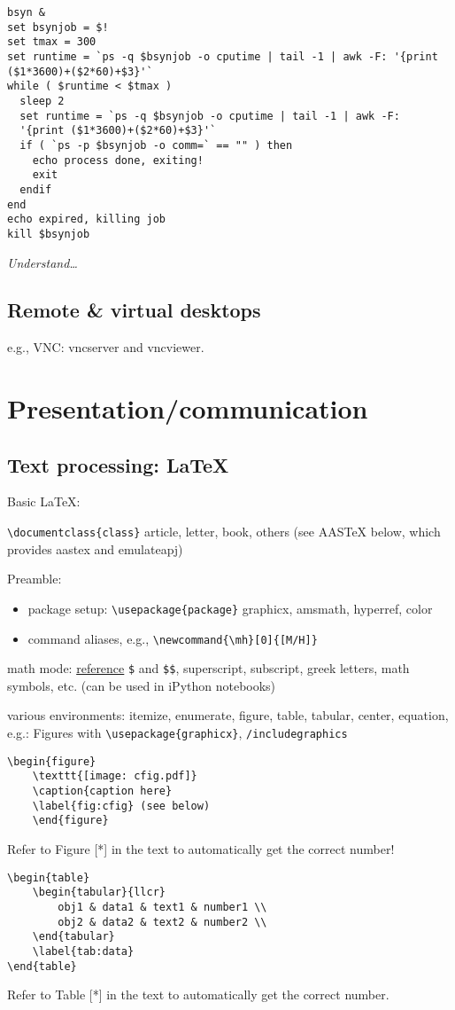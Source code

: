 \documentclass{article}
\newcommand{\test}[1]{%
    \begin{center}
        \colorbox{hl}{\parbox{0.9\textwidth}{\emph{\centering #1}}}
    \end{center}}
\begin{document}
\begin{verbatim}
bsyn &
set bsynjob = $!
set tmax = 300
set runtime = `ps -q $bsynjob -o cputime | tail -1 | awk -F: '{print ($1*3600)+($2*60)+$3}'`
while ( $runtime < $tmax )
  sleep 2
  set runtime = `ps -q $bsynjob -o cputime | tail -1 | awk -F:
  '{print ($1*3600)+($2*60)+$3}'`
  if ( `ps -p $bsynjob -o comm=` == "" ) then
    echo process done, exiting!
    exit
  endif
end
echo expired, killing job
kill $bsynjob
\end{verbatim}

\test{Understand\ldots}

\subsection{Remote \& virtual desktops}
e.g., VNC: vncserver and vncviewer.

\section{Presentation/communication}
\subsection{Text processing: LaTeX}

Basic LaTeX:

\verb|\documentclass{class}| article, letter, book, others (see AASTeX
below, which provides aastex and emulateapj)

Preamble:
\begin{itemize}
    \item package setup: \verb|\usepackage{package}|
        graphicx, amsmath, hyperref, color
    \item command aliases, e.g., \verb|\newcommand{\mh}[0]{[M/H]}|
\end{itemize}
math mode:
\href{https://www.sharelatex.com/learn/Mathematical_expressions}{reference}
\verb|$| and \verb|$$|, superscript, subscript, greek
letters, math symbols, etc. (can be used in iPython notebooks)

various environments: itemize, enumerate, figure, table, tabular,
center, equation, e.g.:
Figures with \verb|\usepackage{graphicx}|, \verb|/includegraphics|
\begin{verbatim}
\begin{figure}
    \texttt{[image: cfig.pdf]}
    \caption{caption here}
    \label{fig:cfig} (see below)
    \end{figure}
\end{verbatim}
Refer to Figure [*] in the text to automatically get the correct
number!
\begin{verbatim}
\begin{table}
    \begin{tabular}{llcr}
        obj1 & data1 & text1 & number1 \\
        obj2 & data2 & text2 & number2 \\
    \end{tabular}
    \label{tab:data}
\end{table}
\end{verbatim}
Refer to Table [*] in the text to automatically get the
correct number.
\end{document}

